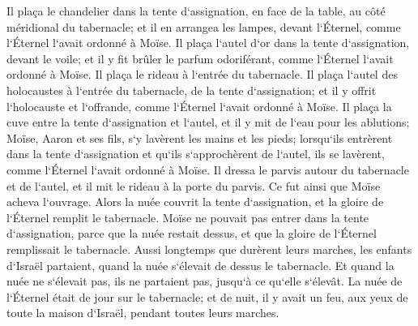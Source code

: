 \verse Il plaça le chandelier dans la tente d`assignation, en face de la table, au côté méridional du tabernacle; 
\verse et il en arrangea les lampes, devant l`Éternel, comme l`Éternel l`avait ordonné à Moïse. 
\verse Il plaça l`autel d`or dans la tente d`assignation, devant le voile; 
\verse et il y fit brûler le parfum odoriférant, comme l`Éternel l`avait ordonné à Moïse. 
\verse Il plaça le rideau à l`entrée du tabernacle. 
\verse Il plaça l`autel des holocaustes à l`entrée du tabernacle, de la tente d`assignation; et il y offrit l`holocauste et l`offrande, comme l`Éternel l`avait ordonné à Moïse. 
\verse Il plaça la cuve entre la tente d`assignation et l`autel, et il y mit de l`eau pour les ablutions; 
\verse Moïse, Aaron et ses fils, s`y lavèrent les mains et les pieds; 
\verse lorsqu`ils entrèrent dans la tente d`assignation et qu`ils s`approchèrent de l`autel, ils se lavèrent, comme l`Éternel l`avait ordonné à Moïse. 
\verse Il dressa le parvis autour du tabernacle et de l`autel, et il mit le rideau à la porte du parvis. Ce fut ainsi que Moïse acheva l`ouvrage. 
\verse Alors la nuée couvrit la tente d`assignation, et la gloire de l`Éternel remplit le tabernacle. 
\verse Moïse ne pouvait pas entrer dans la tente d`assignation, parce que la nuée restait dessus, et que la gloire de l`Éternel remplissait le tabernacle. 
\verse Aussi longtemps que durèrent leurs marches, les enfants d`Israël partaient, quand la nuée s`élevait de dessus le tabernacle. 
\verse Et quand la nuée ne s`élevait pas, ils ne partaient pas, jusqu`à ce qu`elle s`élevât. 
\verse La nuée de l`Éternel était de jour sur le tabernacle; et de nuit, il y avait un feu, aux yeux de toute la maison d`Israël, pendant toutes leurs marches. 
